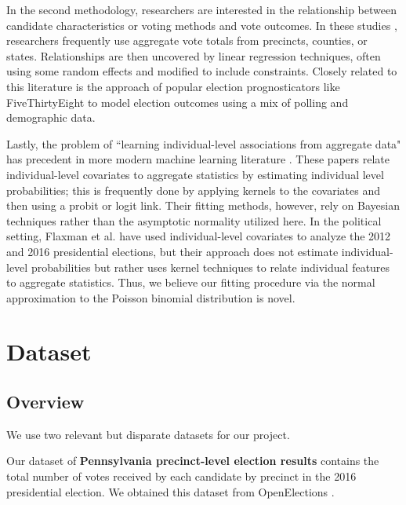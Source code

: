 \documentclass[10pt, letterpaper]{article}
\begin{document}
In the second methodology, researchers are interested in the relationship between candidate characteristics or voting methods and vote outcomes. In these studies \cite{miller1998impact, frisina2008ballot, 10.2307/24371899}, researchers frequently use aggregate vote totals from precincts, counties, or states. Relationships are then uncovered by linear regression techniques, often using some random effects \cite{10.2307/2585758} and modified to include constraints. Closely related to this literature is the approach of popular election prognosticators like FiveThirtyEight \cite{538} to model election outcomes using a mix of polling and demographic data. 

Lastly, the problem of ``learning individual-level associations from aggregate data" \cite{flaxman2015supported} has precedent in more modern machine learning literature \cite{patrini2014almost, kuck2012learning, sun2015message, quadrianto2009estimating}. These papers relate individual-level covariates to aggregate statistics by estimating individual level probabilities; this is frequently done by applying kernels to the covariates and then using a probit or logit link. Their fitting methods, however, rely on Bayesian techniques rather than the asymptotic normality utilized here. In the political setting, Flaxman et al. have used individual-level covariates to analyze the 2012 \cite{flaxman2015supported} and 2016 \cite{flaxman2016understanding} presidential elections, but their approach does not estimate individual-level probabilities but rather uses kernel techniques to relate individual features to aggregate statistics. Thus, we believe our fitting procedure via the normal approximation to the Poisson binomial distribution is novel.

\section{Dataset}

\subsection{Overview}

We use two relevant but disparate datasets for our project.

Our dataset of \textbf{Pennsylvania precinct-level election results} contains the total number of votes received by each candidate by precinct in the 2016 presidential election. We obtained this dataset from OpenElections \cite{OpenElections}.
\end{document}
